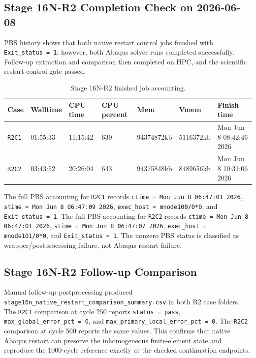 \documentclass[11pt,a4paper]{article}
\newcommand{\code}[1]{\texttt{#1}}
\begin{document}
\subsection{Stage 16N-R2 Completion Check on 2026-06-08}

PBS history shows that both native restart control jobs finished with \code{Exit\_status = 1}; however, both Abaqus solver runs completed successfully. Follow-up extraction and comparison then completed on HPC, and the scientific restart-control gate passed.

\begin{table}[H]
\centering
\caption{Stage 16N-R2 finished job accounting.}
\begin{tabular}{lllllll}
\toprule
Case & Walltime & CPU time & CPU percent & Mem & Vmem & Finish time \\
\midrule
\code{R2C1} & 01:55:33 & 11:15:42 & 639 & 94374872kb & 5116372kb & Mon Jun 8 08:42:46 2026 \\
\code{R2C2} & 03:43:52 & 20:26:04 & 643 & 94375848kb & 8489656kb & Mon Jun 8 10:31:06 2026 \\
\bottomrule
\end{tabular}
\end{table}

The full PBS accounting for \code{R2C1} records \code{ctime = Mon Jun 8 06:47:01 2026}, \code{stime = Mon Jun 8 06:47:09 2026}, \code{exec\_host = mnode100/0*0}, and \code{Exit\_status = 1}. The full PBS accounting for \code{R2C2} records \code{ctime = Mon Jun 8 06:47:01 2026}, \code{stime = Mon Jun 8 06:47:07 2026}, \code{exec\_host = mnode101/0*0}, and \code{Exit\_status = 1}. The nonzero PBS status is classified as wrapper/postprocessing failure, not Abaqus restart failure.

\subsection{Stage 16N-R2 Follow-up Comparison}

Manual follow-up postprocessing produced \code{stage16n\_native\_restart\_comparison\_summary.csv} in both R2 case folders. The \code{R2C1} comparison at cycle 250 reports \code{status = pass}, \code{max\_global\_error\_pct = 0}, and \code{max\_primary\_local\_error\_pct = 0}. The \code{R2C2} comparison at cycle 500 reports the same values. This confirms that native Abaqus restart can preserve the inhomogeneous finite-element state and reproduce the 1000-cycle reference exactly at the checked continuation endpoints.
\end{document}
